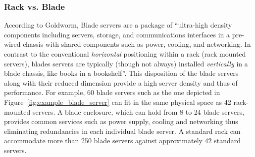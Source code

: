 {            \subsubsection*{Rack vs. Blade}
                According to Goldworm\cite{barbAnne07}, Blade servers are a package of ``ultra-high density components including servers, storage, and communications interfaces in a pre-wired chassis with shared components such as power, cooling, and networking. In contrast to the conventional \emph{horizontal} positioning within a rack (rack mounted servers), blades servers are typically (though not always) installed \emph{vertically} in a blade chassis, like books in a bookshelf''. This disposition of the blade servers along with their reduced dimension provide a high server density and thus of performance. For example, 60 blade servers such as the one depicted in Figure~\ref{fig:example_blade_server} can fit in the same physical space as 42 rack-mounted servers. A blade enclosure, which can hold from 8 to 24 \cite{Rehn08} blade servers, provides common services such as power supply, cooling and networking thus eliminating redundancies in each individual blade server. A standard rack can accommodate more than 250 blade servers against approximately 42 standard servers.
            \begin{figure}[h!tb]
                \centering

\end{figure}}
